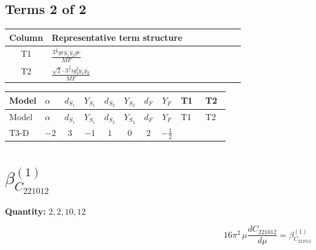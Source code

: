 \documentclass[8pt]{article}
\begin{document}
\begin{landscape}
\subsection*{Terms 2 of 2}
\begin{center}
\begin{tabular}{@{}c >{\raggedright\arraybackslash}p{0.82\linewidth}@{}}
\toprule
Column & Representative term structure \\
\midrule
T1 & \(\displaystyle \frac{3^{\frac{3}{4}} ye \overline{y_{1}} \overline{y_{2}} \overline{ye}}{MF}\) \\
\midrule
T2 & \(\displaystyle \frac{\sqrt{2} \cdot 3^{\frac{3}{4}} i g_{2}^{2} \overline{y_{1}} \overline{y_{2}}}{MF}\) \\
\midrule
\bottomrule
\end{tabular}
\end{center}
\smallskip
\tiny
\begin{longtable}{@{}llcccccc >{\raggedright\arraybackslash}p{0.21\linewidth} >{\raggedright\arraybackslash}p{0.21\linewidth}@{}}
\toprule
Model & $\alpha$ & $d_{S_1}$ & $Y_{S_1}$ & $d_{S_2}$ & $Y_{S_2}$ & $d_F$ & $Y_F$ & T1 & T2 \\
\midrule
\endfirsthead
\toprule
Model & $\alpha$ & $d_{S_1}$ & $Y_{S_1}$ & $d_{S_2}$ & $Y_{S_2}$ & $d_F$ & $Y_F$ & T1 & T2 \\
\midrule
\endhead
T3-D & $-2$ & $3$ & $-1$ & $1$ & $0$ & $2$ & $-\frac{1}{2}$ & \scriptsize\adjustbox{max width=\linewidth}{$\begin{gathered} \frac{3^{\frac{3}{4}} ye \overline{y_{1}} \overline{y_{2}} \overline{ye}}{12 MF}\end{gathered}$} & \scriptsize\adjustbox{max width=\linewidth}{$\begin{gathered} \frac{\sqrt{2} \cdot 3^{\frac{3}{4}} i g_{2}^{2} \overline{y_{1}} \overline{y_{2}}}{3 MF}\end{gathered}$} \\
\midrule
\bottomrule
\end{longtable}
\clearpage
\section*{$\beta_{C_{221012}}^{(1)}$}
\noindent\textbf{Quantity: }$\mathrm{2,2,10,12}$\par\smallskip
\[16\pi^2\,\mu\frac{d C_{221012}}{d\mu}=\beta_{C_{221012}}^{(1)}\]

\end{landscape}
\end{document}
